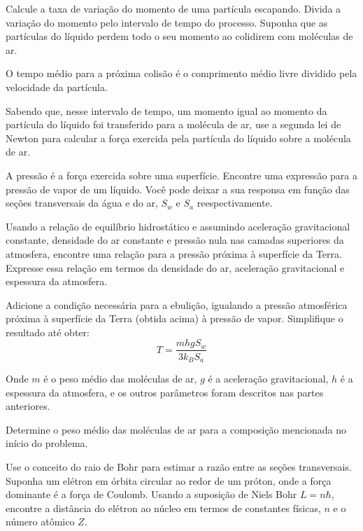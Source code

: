 \documentclass[11pt]{article}
\begin{document}
\begin{pproblem}
\begin{alternativas}
\item Calcule a taxa de variação do momento de uma partícula escapando. Divida a variação do momento pelo intervalo de tempo do processo. Suponha que as partículas do líquido perdem todo o seu momento ao colidirem com moléculas de ar.

O tempo médio para a próxima colisão é o comprimento médio livre dividido pela velocidade da partícula.

Sabendo que, nesse intervalo de tempo, um momento igual ao momento da partícula do líquido foi transferido para a molécula de ar, use a segunda lei de Newton para calcular a força exercida pela partícula do líquido sobre a molécula de ar. 

\item A pressão é a força exercida sobre uma superfície. Encontre uma expressão para a pressão de vapor de um líquido. Você pode deixar a sua responsa em função das seções transversais da água e do ar, \(S_w\) e \(S_a\) reespectivamente.

\item Usando a relação de equilíbrio hidrostático e assumindo aceleração gravitacional constante, densidade do ar constante e pressão nula nas camadas superiores da atmosfera, encontre uma relação para a pressão próxima à superfície da Terra. Expresse essa relação em termos da densidade do ar, aceleração gravitacional e espessura da atmosfera. 

\item Adicione a condição necessária para a ebulição, igualando a pressão atmosférica próxima à superfície da Terra (obtida acima) à pressão de vapor. Simplifique o resultado até obter:
\begin{equation}
    T = \frac{mhg S_w}{3k_B S_a}
\end{equation}

Onde $m$ é o peso médio das moléculas de ar, $g$ é a aceleração gravitacional, $h$ é a espessura da atmosfera, e os outros parâmetros foram descritos nas partes anteriores. 

\item Determine o peso médio das moléculas de ar para a composição mencionada no início do problema. 

\item Use o conceito do raio de Bohr para estimar a razão entre as seções transversais. Suponha um elétron em órbita circular ao redor de um próton, onde a força dominante é a força de Coulomb. Usando a suposição de Niels Bohr $L = n\hbar$, encontre a distância do elétron ao núcleo em termos de constantes físicas, $n$ e o número atômico $Z$. 


\end{alternativas}
\end{pproblem}
\end{document}
